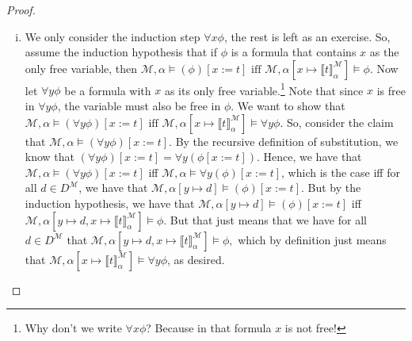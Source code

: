\begin{enumerate}[\thesection.1]
\begin{proof}
\begin{enumerate}[(i)]
                \item We only consider the induction step
                $\forall x\phi$, the rest is left as an
                exercise. So, assume the induction hypothesis that if
                $\phi$ is a formula that contains $x$ as the only free
                variable, then $\mathcal{M},\alpha\vDash (\phi)[x:=t]\text{ iff
              }\mathcal{M},\alpha[x\mapsto \llbracket
              t\rrbracket^\mathcal{M}_\alpha]\vDash \phi$. Now let
              $\forall y\phi$ be a formula with $x$ as its only free
              variable.\footnote{Why don't we write $\forall x\phi$?
                Because in that formula $x$ is not free!} Note that since $x$
              is free in $\forall y\phi$, the variable must 
              also be free in $\phi$. We want to
              show that $\mathcal{M},\alpha\vDash (\forall
              y\phi)[x:=t]\text{ iff }
              \mathcal{M},\alpha[x\mapsto \llbracket
              t\rrbracket^\mathcal{M}_\alpha]\vDash \forall
              y\phi$. So, consider the claim that
              $\mathcal{M},\alpha\vDash (\forall y\phi)[x:=t]$. By the
              recursive definition of substitution, we know
              that $(\forall y\phi)[x:=t]=\forall
              y(\phi[x:=t])$. Hence, we have that $\mathcal{M},\alpha\vDash (\forall
              y\phi)[x:=t]$ iff $\mathcal{M},\alpha\vDash \forall
              y(\phi)[x:=t]$, which is the case iff for all $d\in
              D^\mathcal{M}$, we have that
              $\mathcal{M},\alpha[y\mapsto d]\vDash (\phi)[x:=t]$. But
              by the induction hypothesis, we have that
              $\mathcal{M},\alpha[y\mapsto d]\vDash (\phi)[x:=t]$ iff
              $\mathcal{M},\alpha[y\mapsto d, x\mapsto \llbracket
              t\rrbracket^\mathcal{M}_\alpha]\vDash \phi$. But that just
              means that we have for all $d\in
              D^\mathcal{M}$ that $\mathcal{M},\alpha[y\mapsto d, x\mapsto \llbracket
              t\rrbracket^\mathcal{M}_\alpha]\vDash \phi,$ which by
              definition just means that $\mathcal{M},\alpha[x\mapsto \llbracket
              t\rrbracket^\mathcal{M}_\alpha]\vDash \forall
              y\phi$, as desired.

            \end{enumerate}

          \end{proof}%


\end{enumerate}

